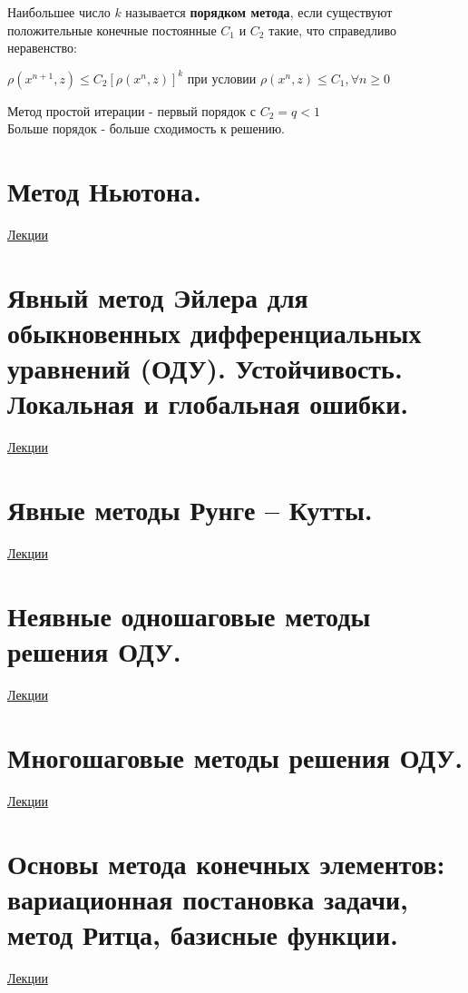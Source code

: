 \documentclass[specialist, subf, href, colorlinks=true, 12pt, times, mtpro, final]{disser}
\theoremstyle{definition}
\begin{document}
Наибольшее число $k$ называется \textbf{порядком метода}, если существуют положительные конечные постоянные $C_1$ и $C_2$ такие, что справедливо неравенство:
\begin{center}
$\rho(x^{n+1}, z) \leq C_2 [\rho(x^n,z)]^k$ 
при условии
 $ \rho (x^n,z) \leq C_1, \forall n \geq 0$
\end{center}

Метод простой итерации - первый порядок с $C_2 = q < 1$\\

Больше порядок - больше сходимость к решению.
	

\section {Метод Ньютона.}
	\hyperlink {lects.83}{Лекции}\\

\section {Явный метод Эйлера для обыкновенных дифференциальных уравнений (ОДУ). Устойчивость. Локальная и глобальная ошибки.}
	\hyperlink {lects.87}{Лекции}\\

\section {Явные методы Рунге -- Кутты.}
	\hyperlink {lects.89}{Лекции}\\

\section {Неявные одношаговые методы решения ОДУ.}
	\hyperlink {lects.91}{Лекции}\\

\section {Многошаговые методы решения ОДУ.}
	\hyperlink {lects.92}{Лекции}\\

\section {Основы метода конечных элементов: вариационная постановка задачи, метод Ритца, базисные функции.}
	\hyperlink {lects.97}{Лекции}\\
\end{document}
